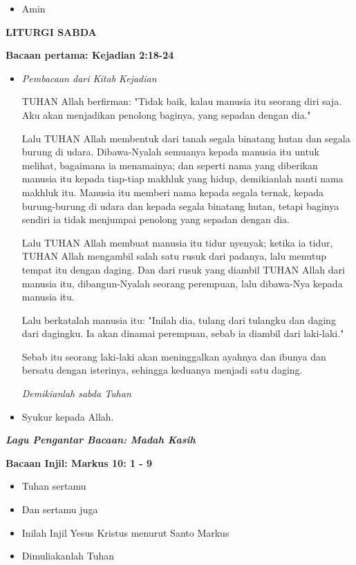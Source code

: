 \documentclass[12pt]{book}
\makeatletter
\newcommand{\judul}[1]{%
  {\parindent \z@ \centering \normalfont
    \interlinepenalty\@M \Large \bfseries #1\par\nobreak \vskip 20\p@ }}
\newcommand{\subjudul}[1]{%
  {\parindent \z@ \normalfont
    \interlinepenalty\@M \bfseries #1\par\nobreak \vskip 20\p@ }}
\newcommand{\lagu}[1]{%
  {\parindent \z@ \normalfont
    \interlinepenalty\@M \bfseries \emph{#1}\par\nobreak \vskip 20\p@ }}
\newcommand{\BU}[1]{\begin{itemize} \item[U:] #1 \end{itemize}}
\newcommand{\BI}[1]{\begin{itemize} \item[I:] #1 \end{itemize}}
\newcommand{\BP}[1]{\begin{itemize} \item[P:] #1 \end{itemize}}
\newcommand{\laguantarbacaan}{Madah Kasih }
\makeatother
\begin{document}
\BU{Amin}

\judul{LITURGI SABDA}

\subjudul{Bacaan pertama: Kejadian 2:18-24}

\BP{\emph{Pembacaan dari Kitab Kejadian}

TUHAN Allah berfirman: "Tidak baik, kalau manusia itu seorang diri saja. Aku akan menjadikan penolong baginya, yang sepadan dengan dia."

Lalu TUHAN Allah membentuk dari tanah segala binatang hutan dan segala burung di udara. Dibawa-Nyalah semuanya kepada manusia itu untuk melihat, bagaimana ia menamainya; dan seperti nama yang diberikan manusia itu kepada tiap-tiap makhluk yang hidup, demikianlah nanti nama makhluk itu.
Manusia itu memberi nama kepada segala ternak, kepada burung-burung di udara dan kepada segala binatang hutan, tetapi baginya sendiri ia tidak menjumpai penolong yang sepadan dengan dia.

Lalu TUHAN Allah membuat manusia itu tidur nyenyak; ketika ia tidur, TUHAN Allah mengambil salah satu rusuk dari padanya, lalu menutup tempat itu dengan daging.
Dan dari rusuk yang diambil TUHAN Allah dari manusia itu, dibangun-Nyalah seorang perempuan, lalu dibawa-Nya kepada manusia itu.

Lalu berkatalah manusia itu: "Inilah dia, tulang dari tulangku dan daging dari dagingku. Ia akan dinamai perempuan, sebab ia diambil dari laki-laki."

Sebab itu seorang laki-laki akan meninggalkan ayahnya dan ibunya dan bersatu dengan isterinya, sehingga keduanya menjadi satu daging.

\emph{Demikianlah sabda Tuhan}
}

\BU{Syukur kepada Allah.}

\lagu{Lagu Pengantar Bacaan: \laguantarbacaan}


\subjudul{Bacaan Injil: Markus 10: 1 - 9}

\BI{Tuhan sertamu}

\BU{Dan sertamu juga}

\BI{Inilah Injil Yesus Kristus menurut Santo Markus}

\BU{Dimuliakanlah Tuhan}
\end{document}
